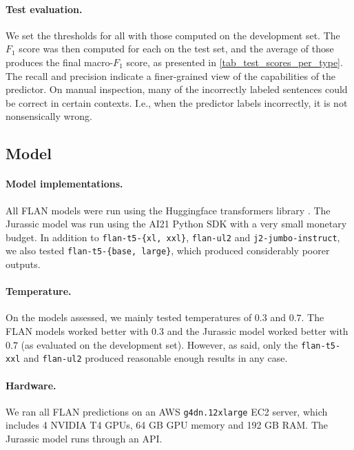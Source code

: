\paragraph{Test evaluation.}
We set the thresholds for all \taxtypes{} with those computed on the development set. The $F_1$ score was then computed for each \taxtype{} on the test set, and the average of those produces the final macro-$F_1$ score, as presented in \autoref{tab_test_scores_per_type}. The recall and precision indicate a finer-grained view of the capabilities of the predictor. On manual inspection, many of the incorrectly labeled sentences could be correct in certain contexts. I.e., when the predictor labels incorrectly, it is not nonsensically wrong.


\subsection{Model}
\label{sec_appendix_predictor_model}

\paragraph{Model implementations.}
All FLAN models were run using the Huggingface transformers library \citep{wolf2020huggingface}. The Jurassic model was run using the AI21 Python SDK \citep{ai212023pythonsdk} with a very small monetary budget. In addition to \texttt{flan-t5-\{xl, xxl\}}, \texttt{flan-ul2} and \texttt{j2-jumbo-instruct}, we also tested \texttt{flan-t5-\{base, large\}}, which produced considerably poorer outputs.

\paragraph{Temperature.}
On the models assessed, we mainly tested temperatures of $0.3$ and $0.7$. The FLAN models worked better with $0.3$ and the Jurassic model worked better with $0.7$ (as evaluated on the development set). However, as said, only the \texttt{flan-t5-xxl} and \texttt{flan-ul2} produced reasonable enough results in any case.

\paragraph{Hardware.}
We ran all FLAN predictions on an AWS \texttt{g4dn.12xlarge} EC2 server, which includes 4 NVIDIA T4 GPUs, 64 GB GPU memory and 192 GB RAM. The Jurassic model runs through an API.

